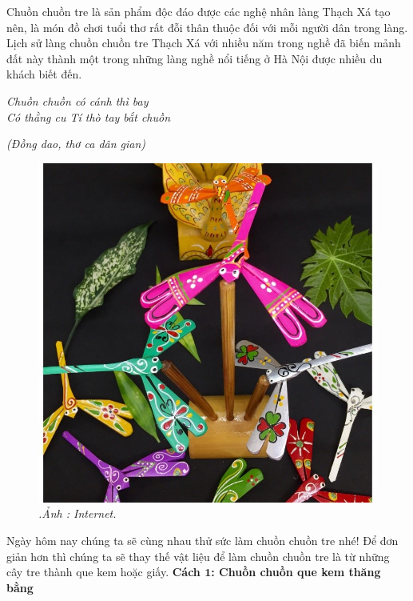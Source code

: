 \begin{multicols}{2}
	
	Chuồn chuồn tre là sản phẩm độc đáo được các nghệ nhân làng Thạch Xá tạo nên, là món đồ chơi tuổi thơ rất đỗi thân thuộc đối với mỗi người dân trong làng. Lịch sử làng chuồn chuồn tre Thạch Xá với nhiều năm trong nghề đã biến mảnh đất này thành một trong những làng nghề nổi tiếng ở Hà Nội được nhiều du khách biết đến.
	\vskip 0.1cm 
	\begin{center}
		\textit{Chuồn chuồn có cánh thì bay\\
	Có thằng cu Tí thò tay bắt chuồn}
	\end{center}
	\hfill \textit{(Đồng dao, thơ ca dân gian)}
	\begin{figure}[H]
		\vspace*{-5pt}
		\centering
		\captionsetup{labelformat= empty, justification=centering}
		\includegraphics[width= 1\linewidth]{10}
		\caption{\small\textit{\color{toancuabi}.Ảnh : Internet.}}
		\vspace*{-10pt}
	\end{figure}
	Ngày hôm nay chúng ta sẽ cùng nhau thử sức làm chuồn chuồn tre nhé! Để đơn giản hơn thì chúng ta sẽ thay thế vật liệu để làm chuồn chuồn tre là từ những cây tre thành que kem hoặc giấy.
	\vskip 0.1cm
	\textbf{\color{toancuabi}Cách $\pmb{1}$: Chuồn chuồn que kem thăng bằng}

\end{multicols}
